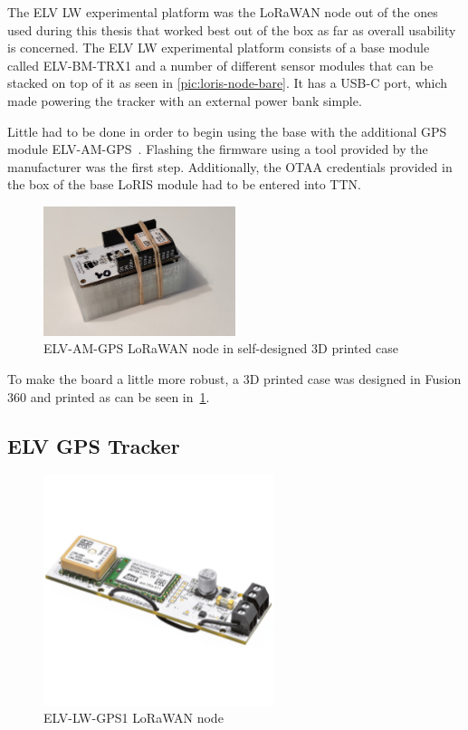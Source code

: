 The ELV LW experimental platform was the \ac{LoRaWAN} node out of the ones used during this thesis that worked best out of the box as far as overall usability is concerned\cite{elv_elektronik_ag_elv-lw-base_2023}.
The ELV LW experimental platform consists of a base module called ELV-BM-TRX1 and a number of different sensor modules that can be stacked on top of it as seen in \cref{pic:loris-node-bare}.
It has a USB-C port, which made powering the tracker with an external power bank simple.

Little had to be done in order to begin using the base with the additional \ac{GPS} module ELV-AM-GPS~\cite{elv_elektronik_ag_elv-track_2022}.
Flashing the firmware using a tool provided by the manufacturer was the first step.
Additionally, the \ac{OTAA} credentials provided in the box of the base LoRIS module had to be entered into \ac{TTN}.

\begin{figure}[h]
    \centering
    \includegraphics[width=0.5\textwidth]{pictures/hardware/gps-nodes/loris_with_case.jpg}
    \caption{ELV-AM-GPS \ac{LoRaWAN} node in self-designed 3D printed case\label{pic:loris-node-with-case}}
\end{figure}

To make the board a little more robust, a 3D printed case was designed in Fusion 360 and printed as can be seen in~\cref{pic:loris-node-with-case}.

\subsection{ELV \acs{GPS} Tracker}

\begin{figure}[h]
    \centering
    \includegraphics[width=0.6\textwidth]{pictures/hardware/gps-nodes/ELV-LW-GPS1.jpg}
    \caption{ELV-LW-GPS1 \ac{LoRaWAN} node~\protect\cite{elv_elektronik_ag_elv_2023}}
\end{figure}

